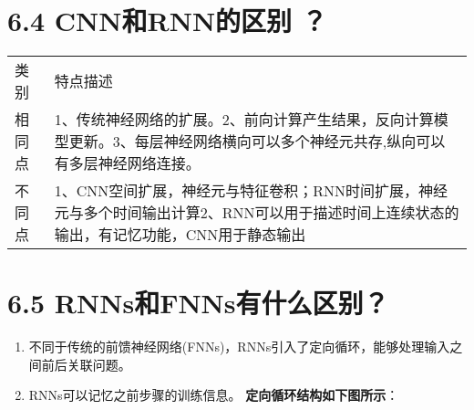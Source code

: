 \section{6.4 CNN和RNN的区别 ？}\label{cnnux548crnnux7684ux533aux522b}

\begin{longtable}[]{ ll }
\begin{minipage}[b]{0.09\columnwidth}\raggedright\strut
类别\strut
\end{minipage} & \begin{minipage}[b]{0.80\columnwidth}\raggedright\strut
特点描述\strut
\end{minipage}\tabularnewline
\begin{minipage}[t]{0.09\columnwidth}\raggedright\strut
相同点\strut
\end{minipage} & \begin{minipage}[t]{0.80\columnwidth}\raggedright\strut
1、传统神经网络的扩展。2、前向计算产生结果，反向计算模型更新。3、每层神经网络横向可以多个神经元共存,纵向可以有多层神经网络连接。\strut
\end{minipage}\tabularnewline
\begin{minipage}[t]{0.09\columnwidth}\raggedright\strut
不同点\strut
\end{minipage} & \begin{minipage}[t]{0.80\columnwidth}\raggedright\strut
1、CNN空间扩展，神经元与特征卷积；RNN时间扩展，神经元与多个时间输出计算2、RNN可以用于描述时间上连续状态的输出，有记忆功能，CNN用于静态输出\strut
\end{minipage}\tabularnewline
\end{longtable}

\section{6.5
RNNs和FNNs有什么区别？}\label{rnnsux548cfnnsux6709ux4ec0ux4e48ux533aux522b}

\begin{enumerate}
\def\labelenumi{\arabic{enumi}.}
\item
  不同于传统的前馈神经网络(FNNs)，RNNs引入了定向循环，能够处理输入之间前后关联问题。
\item
  RNNs可以记忆之前步骤的训练信息。 \textbf{定向循环结构如下图所示}：
\end{enumerate}


